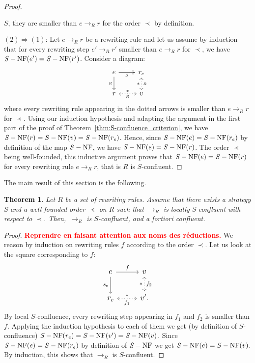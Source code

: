 \documentclass[10pt]{easychair}
\newtheorem{theorem}{Theorem}[section]
\theoremstyle{definition}
\newcommand\todo[1]{{\bf\textcolor{red}{#1}}}
\newcommand\rewR{\to_R}
\DeclareMathOperator{\SNF}{{\it S}-NF}
\begin{document}
\begin{proof}
\begin{itemize}
    $S$, they are smaller than $e\rewR r$ for the order $\prec$ by
    definition.
  \end{itemize}
  $(2)\Rightarrow (1)$: Let $e\rewR r$ be a rewriting rule and let us
  assume by induction that for every rewriting step $e'\rewR r'$ smaller
  than $e\rewR r$ for $\prec$, we have $\SNF(e')=\SNF(r')$. Consider a
  diagram:
  \[\begin{tikzcd}
  e\ar[d, "_R"']\ar[r, twoheadrightarrow, "=", "_S"'] &
  r_e\ar[d, leftrightarrow, dotted, "*"', "_R"]\\
  r\ar[r, leftrightarrow, dotted, "*", "_R"'] & v
  \end{tikzcd}\]
  where every rewriting rule appearing in the dotted arrows is smaller
  than $e\rewR r$ for $\prec$. Using our induction hypothesis and
  adapting the argument in the first part of the proof of
  Theorem~\ref{thm:S-confluence_criterion}, we have
  $\SNF(r)=\SNF(v)=\SNF(r_e)$. Hence, since $\SNF(e)=\SNF(r_e)$ by
  definition of the map $\SNF$, we have $\SNF(e)=\SNF(r)$. The order
  $\prec$ being well-founded, this inductive argument proves that
  $\SNF(e)=\SNF(r)$ for every rewriting rule $e\rewR r$, that is $R$ is
  $S$-confluent.
\end{proof}

The main result of this section is the following.
\medskip

\begin{theorem}\label{thm:confluence_criterion}
  Let $R$ be a set of rewriting rules. Assume that there exists a
  strategy S and a well-founded order $\prec$ on $R$ such that $\rewR$ is
  locally S-confluent with respect to $\prec$. Then,~$\rewR$ is
  $S$-confluent, and \emph{a fortiori} confluent. 
\end{theorem}

\begin{proof}
  \todo{Reprendre en faisant attention aux noms des réductions.}
  We reason by induction on rewriting rules $f$ according to the order
  $\prec$. Let us look at the square corresponding to $f$:
  \[\large\begin{tikzcd}
  e\ar[r, "f"]\ar[d, "s_e"'] & v\ar[d, leftrightarrow, dotted, "*"', "f_2"]\\
  r_e\ar[r, leftrightarrow, dotted, "*", "f_1"'] & v'.
  \end{tikzcd}\]
  By local $S$-confluence, every rewriting step appearing
  in $f_1$ and $f_2$ is smaller than $f$.
  Applying the induction hypothesis to each of them we get
  (by definition of $S$-confluence) $\SNF(r_e) = \SNF(v') = \SNF(v)$.
  Since $\SNF(e) = \SNF(r_e)$ by definition of $\SNF$ we get
  $\SNF(e) = \SNF(v)$. By induction, this shows that $\rewR$ is
  $S$-confluent.
\end{proof}
\medskip
\end{document}
